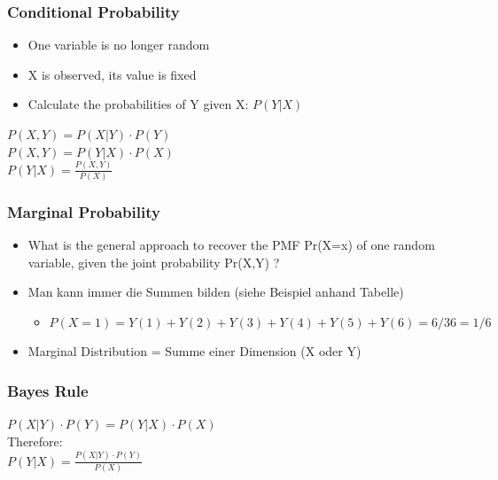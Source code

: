\subsubsection{Conditional Probability}
\begin{itemize}
    \item One variable is no longer random
    \item X is observed, its value is fixed
    \item Calculate the probabilities of Y given X: $P(Y | X)$
\end{itemize}
$P(X, Y) = P(X | Y) \cdot P(Y)$\\ 
$P(X, Y) = P(Y | X) \cdot P(X)$\\
$P(Y | X) = \frac{P(X,Y)}{P(X)}$

\subsubsection{Marginal Probability}
\begin{itemize}
    \item What is the general approach to recover the PMF Pr(X=x) of one random variable, given the joint probability Pr(X,Y) ?
    \item Man kann immer die Summen bilden (siehe Beispiel anhand Tabelle)
    \begin{itemize}
        \item $P(X=1) = Y(1) + Y(2) + Y(3) + Y(4) + Y(5) + Y(6) = 6/36 = 1/6$
    \end{itemize}
    \item Marginal Distribution = Summe einer Dimension (X oder Y)
\end{itemize}

\subsubsection{Bayes Rule}
$P(X|Y) \cdot P(Y) = P(Y|X) \cdot P(X)$\\ 
Therefore:\\
$P(Y|X) = \frac{P(X|Y) \cdot P(Y)}{P(X)}$

